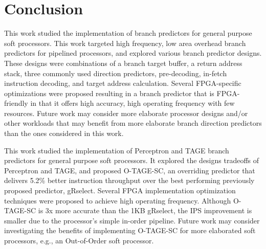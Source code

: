 \chapter{Conclusion}
\label{chap:conclusion}


This work studied the implementation of branch predictors for general purpose soft processors.  This work targeted high frequency, low area overhead branch predictors for pipelined processors, and explored various branch predictor designs. These designs were combinations of a branch target buffer, a return address stack, three commonly used direction predictors, pre-decoding, in-fetch instruction decoding, and target address calculation. Several FPGA-specific optimizations were proposed resulting in a branch predictor that is FPGA-friendly in that it offers high accuracy, high operating frequency with few resources. Future work may consider more elaborate processor designs and/or other workloads that may benefit from more elaborate branch direction predictors than the ones considered in this work.



This work studied the implementation of  Perceptron and TAGE branch predictors for general purpose soft processors. It explored the designs tradeoffs of Perceptron and TAGE, and proposed \mbox{O-TAGE-SC}, an overriding predictor that delivers 5.2\% better instruction throughput over the best performing previously proposed predictor, gRselect. Several FPGA implementation optimization techniques were proposed to achieve high operating frequency. Although \mbox{O-TAGE-SC} is \mytilde 3x more accurate than the 1KB gRselect, the IPS improvement is  smaller due to the processor's simple in-order pipeline. Future work may consider investigating the benefits of implementing \mbox{O-TAGE-SC} for more elaborated soft processors, e.g., an Out-of-Order soft processor. 
